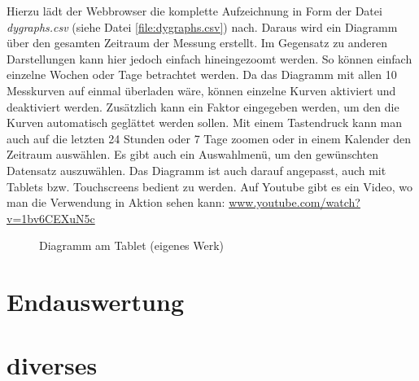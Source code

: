 Hierzu lädt der Webbrowser die komplette Aufzeichnung in Form der Datei \emph{dygraphs.csv} (siehe Datei  \ref{file:dygraphs.csv}) nach. Daraus wird ein Diagramm über den gesamten Zeitraum der Messung erstellt. Im Gegensatz zu anderen Darstellungen kann hier jedoch einfach hineingezoomt werden. So können einfach einzelne Wochen oder Tage betrachtet werden. Da das Diagramm mit allen 10 Messkurven auf einmal überladen wäre, können einzelne Kurven aktiviert und deaktiviert werden. Zusätzlich kann ein Faktor eingegeben werden, um den die Kurven automatisch geglättet werden sollen. Mit einem Tastendruck kann man auch auf die letzten 24 Stunden oder 7 Tage zoomen oder in einem Kalender den Zeitraum auswählen. Es gibt auch ein Auswahlmenü, um den gewünschten Datensatz auszuwählen. Das Diagramm ist auch darauf angepasst, auch mit Tablets bzw. Touchscreens bedient zu werden.
Auf Youtube gibt es ein Video, wo man die Verwendung in Aktion sehen kann: \href{https://www.youtube.com/watch?v=1bv6CEXuN5c}{www.youtube.com/watch?v=1bv6CEXuN5c}
\begin{figure}
  \centering
  \caption{Diagramm am Tablet (eigenes Werk)}
  \label{fig:dygraphs_tablet}
\end{figure}

\section{Endauswertung}
\label{sec:Endauswertung}

\section{diverses}
\label{sec:diverses}

